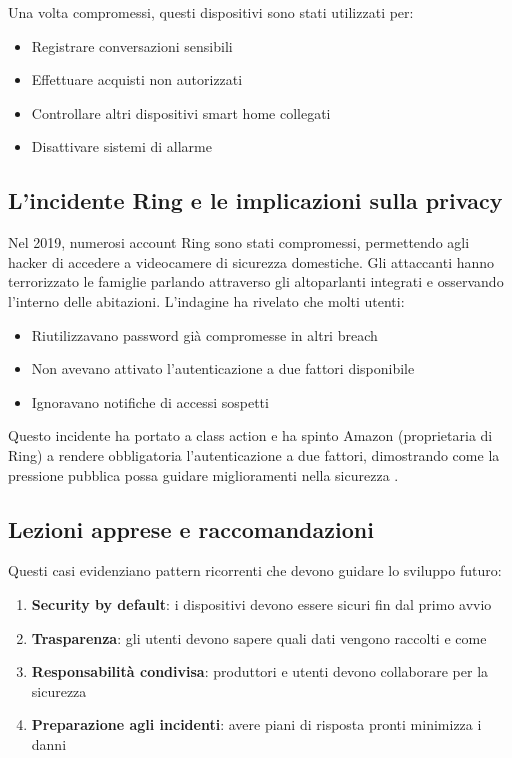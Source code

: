 Una volta compromessi, questi dispositivi sono stati utilizzati per:
\begin{itemize}
    \item Registrare conversazioni sensibili
    \item Effettuare acquisti non autorizzati
    \item Controllare altri dispositivi smart home collegati
    \item Disattivare sistemi di allarme
\end{itemize}

\subsection{L'incidente Ring e le implicazioni sulla privacy}

Nel 2019, numerosi account Ring sono stati compromessi, permettendo agli hacker di accedere a videocamere di sicurezza domestiche. Gli attaccanti hanno terrorizzato le famiglie parlando attraverso gli altoparlanti integrati e osservando l'interno delle abitazioni. L'indagine ha rivelato che molti utenti:

\begin{itemize}
    \item Riutilizzavano password già compromesse in altri breach
    \item Non avevano attivato l'autenticazione a due fattori disponibile
    \item Ignoravano notifiche di accessi sospetti
\end{itemize}

Questo incidente ha portato a class action e ha spinto Amazon (proprietaria di Ring) a rendere obbligatoria l'autenticazione a due fattori, dimostrando come la pressione pubblica possa guidare miglioramenti nella sicurezza \parencite{ringIncident, nestIncident}.

\subsection{Lezioni apprese e raccomandazioni}

Questi casi evidenziano pattern ricorrenti che devono guidare lo sviluppo futuro:

\begin{enumerate}
    \item \textbf{Security by default}: i dispositivi devono essere sicuri fin dal primo avvio
    \item \textbf{Trasparenza}: gli utenti devono sapere quali dati vengono raccolti e come
    \item \textbf{Responsabilità condivisa}: produttori e utenti devono collaborare per la sicurezza
    \item \textbf{Preparazione agli incidenti}: avere piani di risposta pronti minimizza i danni
\end{enumerate}

